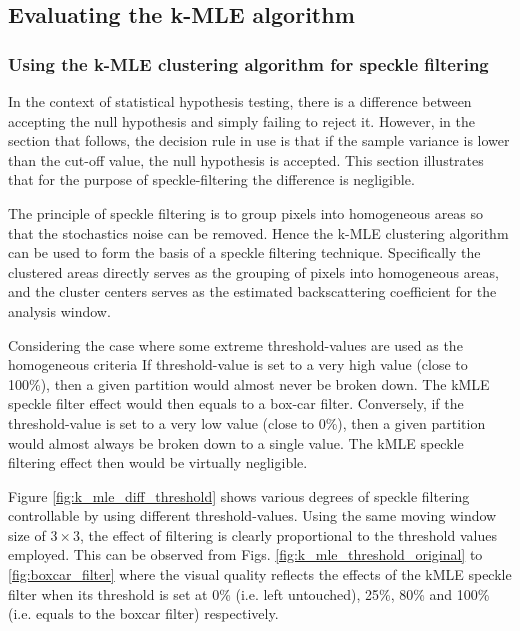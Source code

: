 \subsection{Evaluating the k-MLE algorithm}
\label{sec:k_mle_result}

\subsubsection{Using the k-MLE clustering algorithm for speckle filtering}

In the context of statistical hypothesis testing, there is a difference between accepting the null hypothesis and simply failing to reject it. 
However, in the section that follows, the decision rule in use is that if the sample variance is lower than the cut-off value, the null hypothesis is accepted. 
This section illustrates that for the purpose of speckle-filtering the difference is negligible. 

The principle of speckle filtering is to group pixels into homogeneous areas so that the stochastics noise can be removed.
Hence the k-MLE clustering algorithm can be used to form the basis of a speckle filtering technique.
Specifically the clustered areas directly serves as the grouping of pixels into homogeneous areas, and
the cluster centers serves as the estimated backscattering coefficient for the analysis window.

Considering the case where some extreme threshold-values are used as the homogeneous criteria
If threshold-value is set to a very high value (close to 100\%), then a given partition would almost never be broken down.
The kMLE speckle filter effect would then equals to a box-car filter. 
Conversely, if the threshold-value is set to a very low value (close to 0\%), then a given partition would almost always be broken down to a single value.
The kMLE speckle filtering effect then would be virtually negligible.

Figure \ref{fig:k_mle_diff_threshold} shows various degrees of speckle filtering controllable by using different threshold-values.
Using the same moving window size of $3\times3$, the effect of filtering is clearly proportional to the threshold values employed.
This can be observed from Figs. \ref{fig:k_mle_threshold_original} to \ref{fig:boxcar_filter}
where the  visual quality  reflects the effects of the kMLE speckle filter when its  
threshold is set at 0\% (i.e. left untouched), 25\%, 80\% and 100\% (i.e. equals to the boxcar filter) respectively. 

